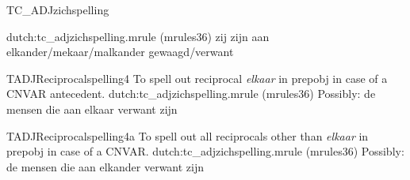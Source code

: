 \begin{mruleclass}{TC\_ADJzichspelling}
\begin{members}
\begin{member}
\file dutch:tc\_adjzichspelling.mrule (mrules36)
\semantics \nosemantics
\example zij zijn aan elkander/mekaar/malkander gewaagd/verwant 

\remarks\mbox{}

\end{member}
\begin{member}
 TADJReciprocalspelling4
 To spell out reciprocal {\em elkaar} in prepobj 
in case of 
a CNVAR antecedent.
\file dutch:tc\_adjzichspelling.mrule (mrules36)
\semantics \nosemantics
\example Possibly: de mensen die aan elkaar verwant zijn
\remarks\mbox{}

\end{member}
\begin{member}
 TADJReciprocalspelling4a
 To spell out all reciprocals other than {\em elkaar} in prepobj 
in case of a CNVAR.
\file dutch:tc\_adjzichspelling.mrule (mrules36)
\semantics \nosemantics
\example Possibly: de mensen die aan elkander verwant zijn
\remarks \mbox{}
\end{member}
\end{members}

\end{mruleclass}

